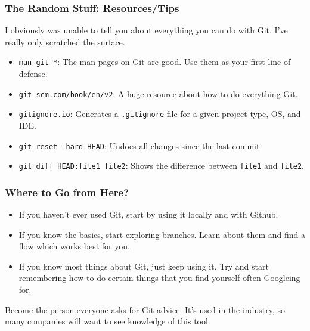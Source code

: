 \documentclass{beeper}
\begin{document}
\begin{frame}
    \frametitle{The Random Stuff: Resources/Tips}

    I obviously was unable to tell you about everything you can do with Git. I've really only
    scratched the surface.

    \begin{itemize}
        \item \texttt{man git *}: The man pages on Git are good. Use them as your first line of
            defense.
        \item \texttt{git-scm.com/book/en/v2}: A huge resource about how to do everything Git.
        \item \texttt{gitignore.io}: Generates a \texttt{.gitignore} file for a given project type,
            OS, and IDE.
        \item \texttt{git reset --hard HEAD}: Undoes all changes since the last commit.
        \item \texttt{git diff HEAD:file1 file2}: Shows the difference between \texttt{file1} and
            \texttt{file2}.
    \end{itemize}
\end{frame}

\begin{frame}
    \frametitle{Where to Go from Here?}
    \begin{itemize}[<+->]
        \item If you haven't ever used Git, start by using it locally and with Github.
        \item If you know the basics, start exploring branches. Learn about them and find a flow
            which works best for you.
        \item If you know most things about Git, just keep using it. Try and start remembering how
            to do certain things that you find yourself often Googleing for. 
    \end{itemize}
    Become the person everyone asks for Git advice. It's used in the industry, so many companies
    will want to see knowledge of this tool.
\end{frame}
\end{document}
